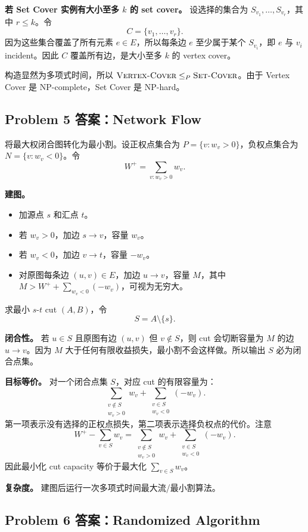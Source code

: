 \documentclass[UTF8,a4paper,11pt]{ctexart}
\begin{document}
\textbf{若 Set Cover 实例有大小至多 $k$ 的 set cover。} 设选择的集合为 $S_{v_1},\ldots,S_{v_r}$，其中 $r\le k$。令
\[
C=\{v_1,\ldots,v_r\}.
\]
因为这些集合覆盖了所有元素 $e\in E$，所以每条边 $e$ 至少属于某个 $S_{v_i}$，即 $e$ 与 $v_i$ incident。因此 $C$ 覆盖所有边，是大小至多 $k$ 的 vertex cover。

构造显然为多项式时间，所以 $\textsc{Vertex-Cover}\le_P\textsc{Set-Cover}$。由于 Vertex Cover 是 NP-complete，Set Cover 是 NP-hard。

\subsection*{Problem 5 答案：Network Flow}

将最大权闭合图转化为最小割。设正权点集合为 $P=\{v:w_v>0\}$，负权点集合为 $N=\{v:w_v<0\}$。令
\[
W^+=\sum_{v:w_v>0}w_v.
\]

\textbf{建图。}
\begin{itemize}
  \item 加源点 $s$ 和汇点 $t$。
  \item 若 $w_v>0$，加边 $s\to v$，容量 $w_v$。
  \item 若 $w_v<0$，加边 $v\to t$，容量 $-w_v$。
  \item 对原图每条边 $(u,v)\in E$，加边 $u\to v$，容量 $M$，其中 $M>W^++\sum_{w_v<0}(-w_v)$，可视为无穷大。
\end{itemize}
求最小 $s$-$t$ cut $(A,B)$，令
\[
S=A\setminus\{s\}.
\]

\textbf{闭合性。} 若 $u\in S$ 且原图有边 $(u,v)$ 但 $v\notin S$，则 cut 会切断容量为 $M$ 的边 $u\to v$。因为 $M$ 大于任何有限收益损失，最小割不会这样做。所以输出 $S$ 必为闭合点集。

\textbf{目标等价。} 对一个闭合点集 $S$，对应 cut 的有限容量为：
\[
\sum_{\substack{v\notin S\\w_v>0}}w_v+\sum_{\substack{v\in S\\w_v<0}}(-w_v).
\]
第一项表示没有选择的正权点损失，第二项表示选择负权点的代价。注意
\[
W^+-\sum_{v\in S}w_v
=
\sum_{\substack{v\notin S\\w_v>0}}w_v+\sum_{\substack{v\in S\\w_v<0}}(-w_v).
\]
因此最小化 cut capacity 等价于最大化 $\sum_{v\in S}w_v$。

\textbf{复杂度。} 建图后运行一次多项式时间最大流/最小割算法。

\subsection*{Problem 6 答案：Randomized Algorithm}
\end{document}
